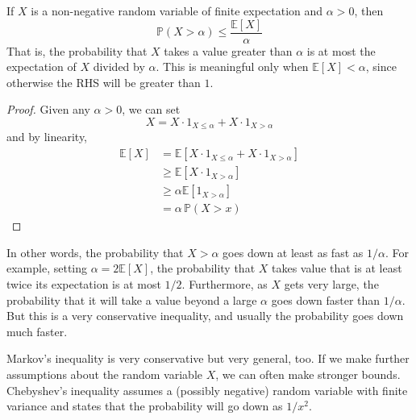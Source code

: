 \documentclass{article}
\begin{document}
    \begin{theorem}
      If $X$ is a non-negative random variable of finite expectation and $\alpha > 0$, then 
      \begin{equation}
        \mathbb{P}(X > \alpha) \leq \frac{\mathbb{E}[X]}{\alpha}
      \end{equation}
      That is, the probability that $X$ takes a value greater than $\alpha$ is at most the expectation of $X$ divided by $\alpha$. This is meaningful only when $\mathbb{E}[X] < \alpha$, since otherwise the RHS will be greater than $1$.  
    \end{theorem}
    \begin{proof}
      Given any $\alpha > 0$, we can set 
      \begin{equation}
        X = X \cdot 1_{X \leq \alpha} + X \cdot 1_{X > \alpha}
      \end{equation}
      and by linearity, 
      \begin{align*}
        \mathbb{E}[X] & = \mathbb{E}[X \cdot 1_{X \leq \alpha} + X \cdot 1_{X > \alpha}] \\
        & \geq \mathbb{E}[ X \cdot 1_{X > \alpha}] \\
        & \geq \alpha \mathbb{E}[1_{X > \alpha}] \\
        & = \alpha \, \mathbb{P}(X > x) 
      \end{align*}
    \end{proof}

    In other words, the probability that $X > \alpha$ goes down at least as fast as $1/\alpha$. For example, setting $\alpha = 2 \mathbb{E}[X]$, the probability that $X$ takes value that is at least twice its expectation is at most $1/2$. Furthermore, as $X$ gets very large, the probability that it will take a value beyond a large $\alpha$ goes down faster than $1/\alpha$. But this is a very conservative inequality, and usually the probability goes down much faster. 

    Markov's inequality is very conservative but very general, too. If we make further assumptions about the random variable $X$, we can often make stronger bounds. Chebyshev's inequality assumes a (possibly negative) random variable with finite variance and states that the probability will go down as $1/x^2$. 
\end{document}
